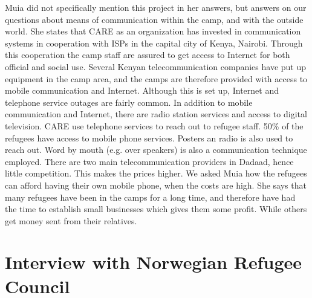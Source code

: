 Muia did not specifically mention this project in her answers, but answers on our questions about means of communication within the camp, and with the outside world. She states that CARE as an organization has invested in communication systems in cooperation with ISPs in the capital city of Kenya, Nairobi. Through this cooperation the camp staff are assured to get access to Internet for both official and social use. Several Kenyan telecommunication companies have put up equipment in the camp area, and the camps are therefore provided with access to mobile communication and Internet. Although this is set up, Internet and telephone service outages are fairly common. In addition to mobile communication and Internet, there are radio station services and access to digital television. CARE use telephone services to reach out to refugee staff. 50\% of the refugees have access to mobile phone services. Posters an radio is also used to reach out. Word by mouth (e.g. over speakers) is also a communication technique employed. There are two main telecommunication providers in Dadaad, hence little competition. This makes the prices higher. We asked Muia how the refugees can afford having their own mobile phone, when the costs are high. She says that many refugees have been in the camps for a long time, and therefore have had the time to establish small businesses which gives them some profit. While others get money sent from their relatives. 


\section{Interview with Norwegian Refugee Council}

